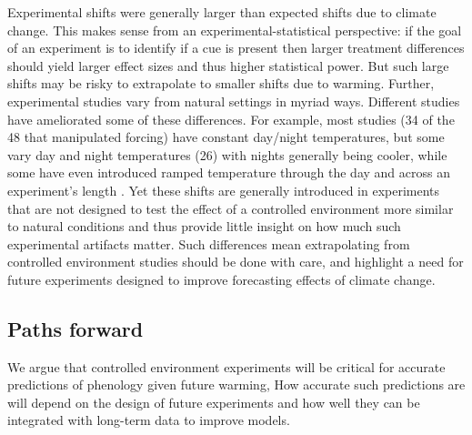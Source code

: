 \documentclass[11pt,letter]{article}
\begin{document}
Experimental shifts were generally larger than expected shifts due to climate change. This makes sense from an experimental-statistical perspective: if the goal of an experiment is to identify if a cue is present then larger treatment differences should yield larger effect sizes and thus higher statistical power. But such large shifts may be risky to extrapolate to smaller shifts due to warming. Further, experimental studies vary from natural settings in myriad ways. Different studies have ameliorated some of these differences. For example, most studies (34 of the 48 that manipulated forcing) have constant day/night temperatures, but some vary day and night temperatures (26) with nights generally being cooler, while some have even introduced ramped temperature through the day and across an experiment's length \citep[e.g.,][]{Basler:2012,Laube:2014a}. Yet these shifts are generally introduced in experiments that are not designed to test the effect of a controlled environment more similar to natural conditions \citep[but see][]{erwin1995} and thus provide little insight on how much such experimental artifacts matter. %
Such differences mean extrapolating from controlled environment studies should be done with care, and highlight a need for future experiments designed to improve forecasting effects of climate change. 

\subsection{Paths forward} %
We argue that controlled environment experiments will be critical for accurate predictions of phenology given future warming, How accurate such predictions are will depend on the design of future experiments and how well they can be integrated with long-term data to improve models. %
\end{document}
